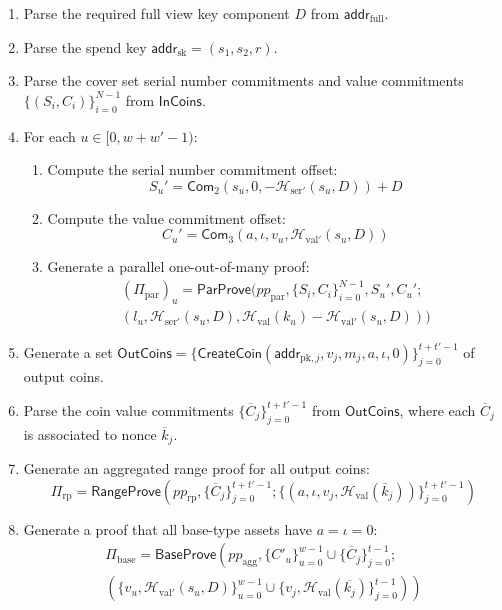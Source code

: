 \documentclass{article}
\newcommand{\func}[1]{\mathsf{#1}}
\newcommand{\addr}{\func{addr}}
\newcommand{\com}{\func{Com}}
\newcommand{\hash}{\mathcal{H}}
\begin{document}
\begin{enumerate}
    \item Parse the required full view key component $D$ from $\addr_{\text{full}}$.
    \item Parse the spend key $\addr_{\text{sk}} = (s_1, s_2, r)$.
    \item Parse the cover set serial number commitments and value commitments $\{(S_i, C_i)\}_{i=0}^{N-1}$ from $\func{InCoins}$.
    \item For each $u \in [0,w+w'-1)$:
    \begin{enumerate}
        \item Compute the serial number commitment offset: $$S_u' = \com_2(s_u, 0, -\hash_{\text{ser}'}(s_u, D)) + D$$
        \item Compute the value commitment offset: $$C_u' = \com_3(a, \iota, v_u, \hash_{\text{val}'}(s_u, D))$$
        \item Generate a parallel one-out-of-many proof:
        \begin{multline*}
        (\Pi_{\text{par}})_u = \func{ParProve}(pp_{\text{par}},\{S_i, C_i\}_{i=0}^{N-1}, S_u',C_u'; \\
        (l_u, \hash_{\text{ser}'}(s_u, D), \hash_{\text{val}}(k_u) - \hash_{\text{val}'}(s_u, D)))
        \end{multline*}
    \end{enumerate}
    \item Generate a set $\func{OutCoins} = \{\func{CreateCoin}(\addr_{\text{pk},j}, v_j, m_j, a, \iota, 0)\}_{j=0}^{t+t'-1}$ of output coins.
    \item Parse the coin value commitments $\{\overline{C}_j\}_{j=0}^{t+t'-1}$ from $\func{OutCoins}$, where each $\overline{C}_j$ is associated to nonce $\overline{k}_j$.
    \item Generate an aggregated range proof for all output coins:
    $$\Pi_{\text{rp}} = \func{RangeProve}\left( pp_{\text{rp}}, \{\overline{C}_j\}_{j=0}^{t+t'-1} ; \{(a, \iota, v_j, \hash_{\text{val}}(\overline{k}_j))\}_{j=0}^{t+t'-1} \right)$$
    \item Generate a proof that all base-type assets have $a = \iota = 0$:
    \begin{multline*}
        \Pi_{\text{base}} = \func{BaseProve}\left( pp_{\text{agg}}, \{C'_u\}_{u=0}^{w-1} \cup \{\overline{C}_j\}_{j=0}^{t-1} ; \right. \\
        \left. \left( \{v_u, \hash_{\text{val}'}(s_u, D)\}_{u=0}^{w-1} \cup \{v_j, \hash_{\text{val}}(\overline{k_j})\}_{j=0}^{t-1} \right) \right)

\end{multline*}
\end{enumerate}
\end{document}

